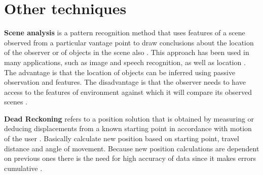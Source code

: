 \section{Other techniques}
\textbf{Scene analysis} is a pattern recognition method that uses features of a scene observed from a particular vantage point to draw conclusions about the location of the observer or of objects in the scene also \cite{LSfUC}. This approach has been used in many applications, such as image and speech recognition, as well as location \cite{LSAWIFI}. The advantage is that the location of objects can be inferred using passive observation and features. The disadvantage is that the observer needs to have access to the features of environment against which it will compare its observed scenes \cite{LSfUC}.

\medskip

\textbf{Dead Reckoning} refers to a position solution that is obtained by measuring or deducing displacements from a known starting point in accordance with motion of the user \cite{DRNS}. Basically calculate new position based on starting point, travel distance and angle of movement. Because new position calculations are dependent on previous ones there is the need for high accuracy of data since it makes errors cumulative \cite{IDRAIP}.